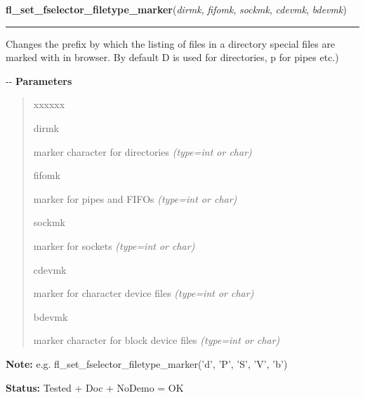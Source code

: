 \hspace{.8\funcindent}\begin{boxedminipage}{\funcwidth}

    \raggedright \textbf{fl\_set\_fselector\_filetype\_marker}(\textit{dirmk}, \textit{fifomk}, \textit{sockmk}, \textit{cdevmk}, \textit{bdevmk})

    \vspace{-1.5ex}

    \rule{\textwidth}{0.5\fboxrule}
\setlength{\parskip}{2ex}

Changes the prefix by which the listing of files in a directory special
files are marked with in browser. By default D is used for directories, p
for pipes etc.)

-{}-
\setlength{\parskip}{1ex}
      \textbf{Parameters}
      \vspace{-1ex}

      \begin{quote}
        \begin{Ventry}{xxxxxx}

          \item[dirmk]


marker character for directories
            {\it (type=int or char)}

          \item[fifomk]


marker for pipes and FIFOs
            {\it (type=int or char)}

          \item[sockmk]


marker for sockets
            {\it (type=int or char)}

          \item[cdevmk]


marker for character device files
            {\it (type=int or char)}

          \item[bdevmk]


marker character for block device files
            {\it (type=int or char)}

        \end{Ventry}

      \end{quote}

\textbf{Note:} 
e.g. fl\_set\_fselector\_filetype\_marker('d', 'P', 'S', 'V', 'b')


\textbf{Status:} 
Tested + Doc + NoDemo = OK


    \end{boxedminipage}

